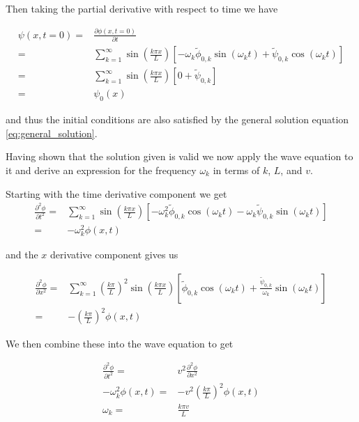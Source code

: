 \documentclass{article}
\begin{document}
Then taking the partial derivative with respect to time we have

\begin{equation}
\begin{split}
	\psi(x,t=0) =& \frac{\partial \phi(x,t=0)}{\partial t}
	\\ =& \sum^{\infty}_{k=1} \sin(\frac{k\pi x}{L}) \left[-\omega_k \widetilde{\phi}_{0,k} \sin(\omega_k t) + \widetilde{\psi}_{0,k} \cos(\omega_k t) \right]
	\\ =& \sum^{\infty}_{k=1} \sin(\frac{k\pi x}{L}) \left[0 + \widetilde{\psi}_{0,k} \right]
	\\ =& \psi_0(x)
\end{split}
\end{equation}

and thus the initial conditions are also satisfied by the general solution equation \ref{eq:general_solution}.

Having shown that the solution given is valid we now apply the wave equation to it and derive an expression for the frequency $\omega_k$ in terms of $k$, $L$, and $v$.

Starting with the time derivative component we get
\begin{equation}
\begin{split}
	\frac{\partial^2 \phi}{\partial t^2} =& \sum^{\infty}_{k=1} \sin(\frac{k\pi x}{L}) \left[-\omega_k^2 \widetilde{\phi}_{0,k} \cos(\omega_k t) - \omega_k \widetilde{\psi}_{0,k} \sin(\omega_k t) \right]
	\\ =& - \omega_k^2 \phi(x,t)
\end{split}
\end{equation}

and the $x$ derivative component gives us

\begin{equation}
\begin{split}
	\frac{ \partial^2 \phi }{ \partial x^2} =& \sum^{\infty}_{k=1} \left( \frac{k\pi}{L} \right)^2 \sin(\frac{k\pi x}{L}) \left[ \widetilde{\phi}_{0,k} \cos(\omega_k t) + \frac{\widetilde{\psi}_{0,k}}{\omega_k} \sin(\omega_k t) \right]
	\\ =& - \left( \frac{k \pi}{L} \right)^2 \phi(x,t)
\end{split}
\end{equation}

We then combine these into the wave equation to get

\begin{equation}
\begin{split}
	\frac{\partial^2 \phi}{\partial t^2} =& v^2 \frac{\partial^2 \phi}{\partial x^2}
	\\ -\omega_k^2 \phi(x,t) =& - v^2 \left( \frac{k \pi}{L} \right)^2 \phi(x,t)
	\\ \omega_k =& \frac{k \pi v}{L}
\end{split}
\end{equation}
\end{document}

